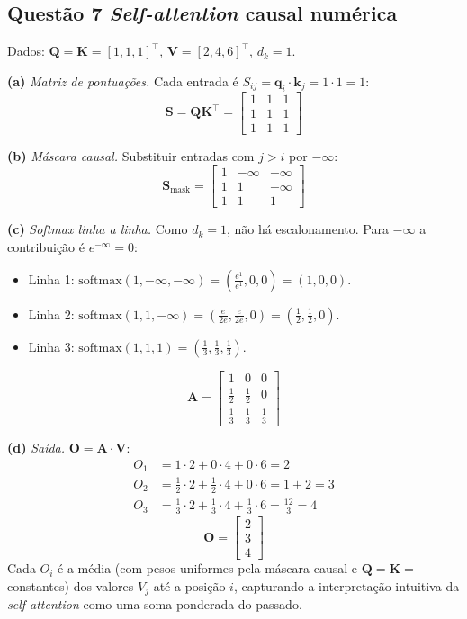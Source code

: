 \documentclass[11pt,a4paper]{article}
\begin{document}
\subsection*{Questão 7 \textemdash{} \textit{Self-attention} causal numérica}

Dados: $\mathbf{Q} = \mathbf{K} = [1, 1, 1]^\top$, $\mathbf{V} = [2, 4, 6]^\top$, $d_k = 1$.

\textbf{(a)} \textit{Matriz de pontuações.} Cada entrada é $S_{ij} = \mathbf{q}_i \cdot \mathbf{k}_j = 1 \cdot 1 = 1$:
\[
\mathbf{S} = \mathbf{Q}\mathbf{K}^\top = \begin{bmatrix}
1 & 1 & 1 \\
1 & 1 & 1 \\
1 & 1 & 1
\end{bmatrix}
\]

\textbf{(b)} \textit{Máscara causal.} Substituir entradas com $j > i$ por $-\infty$:
\[
\mathbf{S}_\text{mask} = \begin{bmatrix}
1      & -\infty & -\infty \\
1      & 1       & -\infty \\
1      & 1       & 1
\end{bmatrix}
\]

\textbf{(c)} \textit{Softmax linha a linha.} Como $d_k = 1$, não há escalonamento. Para $-\infty$ a contribuição é $e^{-\infty} = 0$:
\begin{itemize}
    \item Linha 1: $\mathrm{softmax}(1, -\infty, -\infty) = \left(\tfrac{e^1}{e^1}, 0, 0\right) = (1, 0, 0)$.
    \item Linha 2: $\mathrm{softmax}(1, 1, -\infty) = \left(\tfrac{e}{2e}, \tfrac{e}{2e}, 0\right) = (\tfrac{1}{2}, \tfrac{1}{2}, 0)$.
    \item Linha 3: $\mathrm{softmax}(1, 1, 1) = (\tfrac{1}{3}, \tfrac{1}{3}, \tfrac{1}{3})$.
\end{itemize}
\[
\mathbf{A} = \begin{bmatrix}
1            & 0            & 0            \\
\tfrac{1}{2} & \tfrac{1}{2} & 0            \\
\tfrac{1}{3} & \tfrac{1}{3} & \tfrac{1}{3}
\end{bmatrix}
\]

\textbf{(d)} \textit{Saída.} $\mathbf{O} = \mathbf{A} \cdot \mathbf{V}$:
\begin{align*}
O_1 &= 1 \cdot 2 + 0 \cdot 4 + 0 \cdot 6 = 2 \\
O_2 &= \tfrac{1}{2} \cdot 2 + \tfrac{1}{2} \cdot 4 + 0 \cdot 6 = 1 + 2 = 3 \\
O_3 &= \tfrac{1}{3} \cdot 2 + \tfrac{1}{3} \cdot 4 + \tfrac{1}{3} \cdot 6 = \tfrac{12}{3} = 4
\end{align*}
\[
\mathbf{O} = \begin{bmatrix} 2 \\ 3 \\ 4 \end{bmatrix}
\]
Cada $O_i$ é a média (com pesos uniformes pela máscara causal e $\mathbf{Q} = \mathbf{K} = $ constantes) dos valores $V_j$ até a posição $i$, capturando a interpretação intuitiva da \textit{self-attention} como uma soma ponderada do passado.

\color{black}
\end{document}
